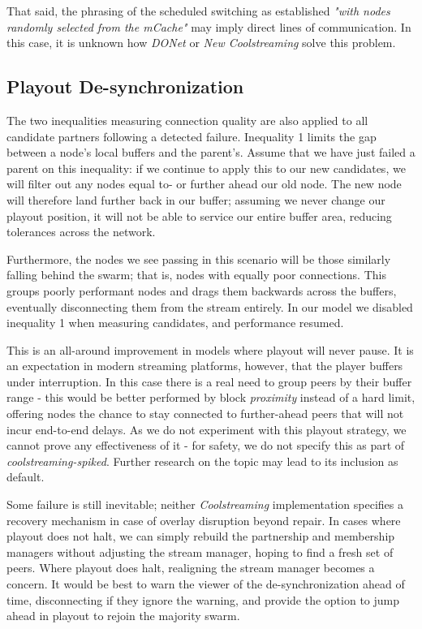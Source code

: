 \documentclass[12pt,a4paper]{article}
\begin{document}
That said, the phrasing of the scheduled switching as established \textit{"with nodes randomly selected from the mCache"} may imply direct lines of communication. In this case, it is unknown how \textit{DONet} or \textit{New Coolstreaming} solve this problem.

\subsection{Playout De-synchronization} \label{problems:newpartners}
The two inequalities measuring connection quality are also applied to all candidate partners following a detected failure. Inequality 1 limits the gap between a node's local buffers and the parent's. Assume that we have just failed a parent on this inequality: if we continue to apply this to our new candidates, we will filter out any nodes equal to- or further ahead our old node. The new node will therefore land further back in our buffer; assuming we never change our playout position, it will not be able to service our entire buffer area, reducing tolerances across the network.

Furthermore, the nodes we see passing in this scenario will be those similarly falling behind the swarm; that is, nodes with equally poor connections. This groups poorly performant nodes and drags them backwards across the buffers, eventually disconnecting them from the stream entirely. In our model we disabled inequality 1 when measuring candidates, and performance resumed.

This is an all-around improvement in models where playout will never pause. It is an expectation in modern streaming platforms, however, that the player buffers under interruption. In this case there is a real need to group peers by their buffer range - this would be better performed by block \textit{proximity} instead of a hard limit, offering nodes the chance to stay connected to further-ahead peers that will not incur end-to-end delays. As we do not experiment with this playout strategy, we cannot prove any effectiveness of it - for safety, we do not specify this as part of \textit{coolstreaming-spiked}. Further research on the topic may lead to its inclusion as default.

Some failure is still inevitable; neither \textit{Coolstreaming} implementation specifies a recovery mechanism in case of overlay disruption beyond repair. In cases where playout does not halt, we can simply rebuild the partnership and membership managers without adjusting the stream manager, hoping to find a fresh set of peers. Where playout does halt, realigning the stream manager becomes a concern. It would be best to warn the viewer of the de-synchronization ahead of time, disconnecting if they ignore the warning, and provide the option to jump ahead in playout to rejoin the majority swarm.
\end{document}
